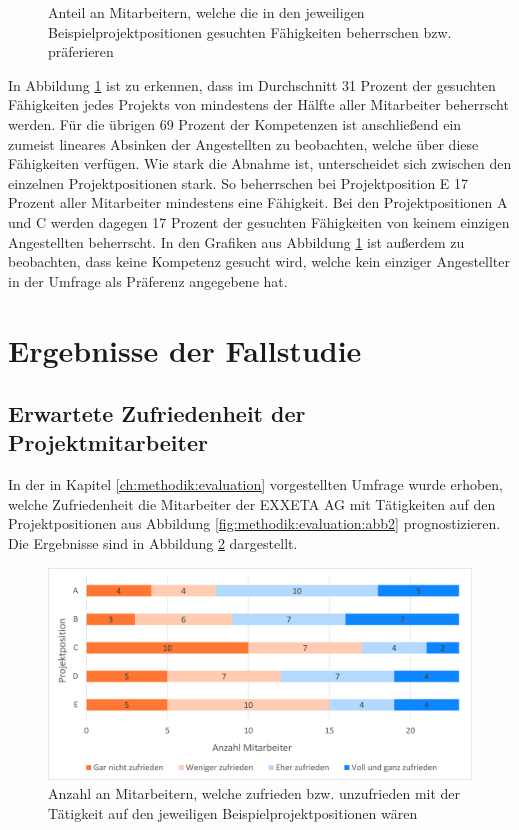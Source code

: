 \begin{figure}[h]
	\caption{Anteil an Mitarbeitern, welche die in den jeweiligen Beispielprojektpositionen gesuchten Fähigkeiten beherrschen bzw. präferieren}
\label{fig:ergebnisse:analyse:abb6}
\end{figure}

In Abbildung \ref{fig:ergebnisse:analyse:abb6} ist zu erkennen, dass im Durchschnitt 31 Prozent der gesuchten Fähigkeiten jedes Projekts von mindestens der Hälfte aller Mitarbeiter beherrscht werden. Für die übrigen 69 Prozent der Kompetenzen ist anschließend ein zumeist lineares Absinken der Angestellten zu beobachten, welche über diese Fähigkeiten verfügen. Wie stark die Abnahme ist, unterscheidet sich zwischen den einzelnen Projektpositionen stark. So beherrschen bei Projektposition E 17 Prozent aller Mitarbeiter mindestens eine Fähigkeit. Bei den Projektpositionen A und C werden dagegen 17 Prozent der gesuchten Fähigkeiten von keinem einzigen Angestellten beherrscht. In den Grafiken aus Abbildung \ref{fig:ergebnisse:analyse:abb6} ist außerdem zu beobachten, dass keine Kompetenz gesucht wird, welche kein einziger Angestellter in der Umfrage als Präferenz angegebene hat.

\section{Ergebnisse der Fallstudie}
\label{ch:ergebnisse:fallstudie}

\subsection{Erwartete Zufriedenheit der Projektmitarbeiter}
\label{ch:ergebnisse:fallstudie:umfrageMitarbeiter}
In der in Kapitel \ref{ch:methodik:evaluation} vorgestellten Umfrage wurde erhoben, welche Zufriedenheit die Mitarbeiter der EXXETA AG mit Tätigkeiten auf den Projektpositionen aus Abbildung \ref{fig:methodik:evaluation:abb2} prognostizieren. Die Ergebnisse sind in Abbildung \ref{fig:ergebnisse:fallstudie:abb1} dargestellt.

\begin{figure}[h]
	\centering
	\includegraphics[width=1\textwidth]{gfx/mitarbeiter-zufriedenheit-umfrage.png}
	\caption{Anzahl an Mitarbeitern, welche zufrieden bzw. unzufrieden mit der Tätigkeit auf den jeweiligen Beispielprojektpositionen wären}
	\label{fig:ergebnisse:fallstudie:abb1}
\end{figure}

